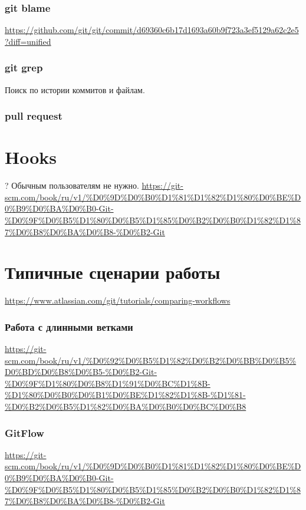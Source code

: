 \begin{frame}
\frametitle{git blame}
\label{sec-3-12}

\href{https://github.com/git/git/commit/d69360c6b17d1693a60b9f723a3ef5129a62c2e5?diff=unified}{https://github.com/git/git/commit/d69360c6b17d1693a60b9f723a3ef5129a62c2e5?diff=unified}
\end{frame}
\begin{frame}
\frametitle{git grep}
\label{sec-3-13}

Поиск по истории коммитов и файлам.
\end{frame}
\begin{frame}
\frametitle{pull request}
\label{sec-3-14}
\end{frame}
\section{Hooks}
\label{sec-4}

? Обычным пользователям не нужно.
\href{https://git-scm.com/book/ru/v1/%D0%9D%D0%B0%D1%81%D1%82%D1%80%D0%BE%D0%B9%D0%BA%D0%B0-Git-%D0%9F%D0%B5%D1%80%D0%B5%D1%85%D0%B2%D0%B0%D1%82%D1%87%D0%B8%D0%BA%D0%B8-%D0%B2-Git}{https://git-scm.com/book/ru/v1/\%D0\%9D\%D0\%B0\%D1\%81\%D1\%82\%D1\%80\%D0\%BE\%D0\%B9\%D0\%BA\%D0\%B0-Git-\%D0\%9F\%D0\%B5\%D1\%80\%D0\%B5\%D1\%85\%D0\%B2\%D0\%B0\%D1\%82\%D1\%87\%D0\%B8\%D0\%BA\%D0\%B8-\%D0\%B2-Git}
\section{Типичные сценарии работы}
\label{sec-5}

\href{https://www.atlassian.com/git/tutorials/comparing-workflows}{https://www.atlassian.com/git/tutorials/comparing-workflows}
\begin{frame}
\frametitle{Работа с длинными ветками}
\label{sec-5-1}

\href{https://git-scm.com/book/ru/v1/%D0%92%D0%B5%D1%82%D0%B2%D0%BB%D0%B5%D0%BD%D0%B8%D0%B5-%D0%B2-Git-%D0%9F%D1%80%D0%B8%D1%91%D0%BC%D1%8B-%D1%80%D0%B0%D0%B1%D0%BE%D1%82%D1%8B-%D1%81-%D0%B2%D0%B5%D1%82%D0%BA%D0%B0%D0%BC%D0%B8}{https://git-scm.com/book/ru/v1/\%D0\%92\%D0\%B5\%D1\%82\%D0\%B2\%D0\%BB\%D0\%B5\%D0\%BD\%D0\%B8\%D0\%B5-\%D0\%B2-Git-\%D0\%9F\%D1\%80\%D0\%B8\%D1\%91\%D0\%BC\%D1\%8B-\%D1\%80\%D0\%B0\%D0\%B1\%D0\%BE\%D1\%82\%D1\%8B-\%D1\%81-\%D0\%B2\%D0\%B5\%D1\%82\%D0\%BA\%D0\%B0\%D0\%BC\%D0\%B8}
\end{frame}
\begin{frame}
\frametitle{GitFlow}
\label{sec-5-2}

\href{https://git-scm.com/book/ru/v1/%D0%9D%D0%B0%D1%81%D1%82%D1%80%D0%BE%D0%B9%D0%BA%D0%B0-Git-%D0%9F%D0%B5%D1%80%D0%B5%D1%85%D0%B2%D0%B0%D1%82%D1%87%D0%B8%D0%BA%D0%B8-%D0%B2-Git}{https://git-scm.com/book/ru/v1/\%D0\%9D\%D0\%B0\%D1\%81\%D1\%82\%D1\%80\%D0\%BE\%D0\%B9\%D0\%BA\%D0\%B0-Git-\%D0\%9F\%D0\%B5\%D1\%80\%D0\%B5\%D1\%85\%D0\%B2\%D0\%B0\%D1\%82\%D1\%87\%D0\%B8\%D0\%BA\%D0\%B8-\%D0\%B2-Git}
\end{frame}
